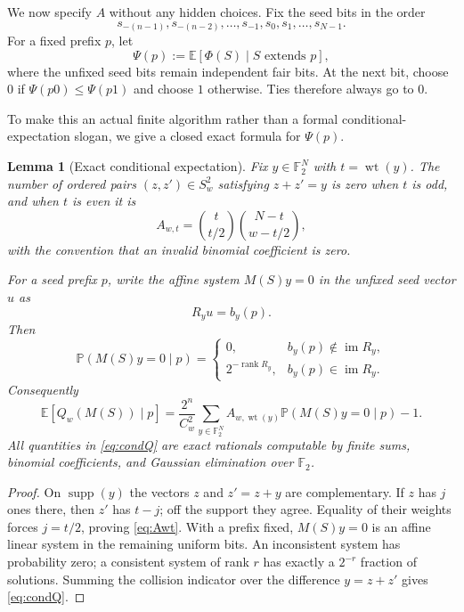 \documentclass[11pt]{article}
\newtheorem{lemma}[theorem]{Lemma}
\newcommand{\F}{\mathbb F}
\newcommand{\1}{\mathbf 1}
\newcommand{\wt}{\operatorname{wt}}
\newcommand{\E}{\mathbb E}
\newcommand{\Pp}{\mathbb P}
\begin{document}
We now specify $A$ without any hidden choices.  Fix the seed bits in the order
\[
 s_{-(n-1)},s_{-(n-2)},\dots,s_{-1},s_0,s_1,\dots,s_{N-1}.
\]
For a fixed prefix $p$, let
\[
 \Psi(p):=\E[\Phi(S)\mid S\text{ extends }p],
\]
where the unfixed seed bits remain independent fair bits.  At the next bit, choose $0$ if $\Psi(p0)\le\Psi(p1)$ and choose $1$ otherwise.  Ties therefore always go to $0$.

To make this an actual finite algorithm rather than a formal conditional-expectation slogan, we give a closed exact formula for $\Psi(p)$.

\begin{lemma}[Exact conditional expectation]\label{lem:conditional}
Fix $y\in\F_2^N$ with $t=\wt(y)$.  The number of ordered pairs $(z,z')\in S_w^2$ satisfying $z+z'=y$ is zero when $t$ is odd, and when $t$ is even it is
\begin{equation}\label{eq:Awt}
 A_{w,t}=\binom{t}{t/2}\binom{N-t}{w-t/2},
\end{equation}
with the convention that an invalid binomial coefficient is zero.

For a seed prefix $p$, write the affine system $M(S)y=0$ in the unfixed seed vector $u$ as
\[
 R_yu=b_y(p).
\]
Then
\begin{equation}\label{eq:affprob}
 \Pp(M(S)y=0\mid p)=
 \begin{cases}
 0,&b_y(p)\notin\operatorname{im}R_y,\\
 2^{-\operatorname{rank}R_y},&b_y(p)\in\operatorname{im}R_y.
 \end{cases}
\end{equation}
Consequently
\begin{equation}\label{eq:condQ}
 \E[Q_w(M(S))\mid p]
 =\frac{2^n}{C_w^2}\sum_{y\in\F_2^N}A_{w,\wt(y)}
   \Pp(M(S)y=0\mid p)-1.
\end{equation}
All quantities in \eqref{eq:condQ} are exact rationals computable by finite sums, binomial coefficients, and Gaussian elimination over $\F_2$.
\end{lemma}

\begin{proof}
On $\operatorname{supp}(y)$ the vectors $z$ and $z'=z+y$ are complementary.  If $z$ has $j$ ones there, then $z'$ has $t-j$; off the support they agree.  Equality of their weights forces $j=t/2$, proving \eqref{eq:Awt}.  With a prefix fixed, $M(S)y=0$ is an affine linear system in the remaining uniform bits.  An inconsistent system has probability zero; a consistent system of rank $r$ has exactly a $2^{-r}$ fraction of solutions.  Summing the collision indicator over the difference $y=z+z'$ gives \eqref{eq:condQ}.
\end{proof}
\end{document}

